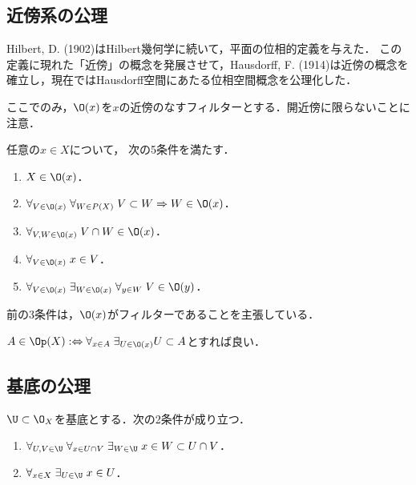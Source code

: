 \documentclass[uplatex,dvipdfmx]{jsreport}
\begin{document}
\subsection{近傍系の公理}

\begin{tcolorbox}[colframe=ForestGreen, colback=ForestGreen!10!white,breakable,colbacktitle=ForestGreen!40!white,coltitle=black,fonttitle=\bfseries\sffamily,
title=]
    Hilbert, D. (1902)はHilbert幾何学に続いて，平面の位相的定義を与えた．
    この定義に現れた「近傍」の概念を発展させて，Hausdorff, F. (1914)は近傍の概念を確立し，現在ではHausdorff空間にあたる位相空間概念を公理化した．
\end{tcolorbox}

\begin{notation}
    ここでのみ，$\O(x)$を$x$の近傍のなすフィルターとする．開近傍に限らないことに注意．
\end{notation}

\begin{proposition}
    任意の$x\in X$について，
    次の5条件を満たす．
    \begin{enumerate}
        \item $X\in\O(x)$．
        \item $\forall_{V\in\O(x)}\;\forall_{W\in P(X)}\;V\subset W\Rightarrow W\in\O(x)$．
        \item $\forall_{V,W\in\O(x)}\;V\cap W\in\O(x)$．
        \item $\forall_{V\in\O(x)}\;x\in V$．
        \item $\forall_{V\in\O(x)}\;\exists_{W\in\O(x)}\;\forall_{y\in W}\;V\in\O(y)$．
    \end{enumerate}
    前の3条件は，$\O(x)$がフィルターであることを主張している．
\end{proposition}

\begin{proposition}[近傍系の定める位相]
    $A\in\Op(X):\Leftrightarrow\forall_{x\in A}\;\exists_{U\in\O(x)}U\subset A$とすれば良い．
\end{proposition}

\subsection{基底の公理}

\begin{proposition}
    $\U\subset\O_X$を基底とする．次の2条件が成り立つ．
    \begin{enumerate}
        \item $\forall_{U,V\in\U}\;\forall_{x\in U\cap V}\;\exists_{W\in\U}\;x\in W\subset U\cap V$．
        \item $\forall_{x\in X}\;\exists_{U\in\U}\;x\in U$．
    \end{enumerate}
\end{proposition}
\end{document}
